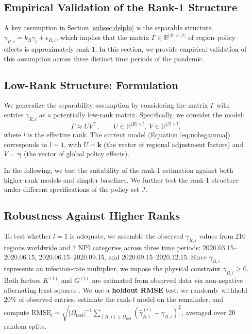 \documentclass[msom,blindrev]{informs3} %
\newcommand{\rev}[1]{{\color{blue}#1}}
\begin{document}
\begin{APPENDICES}
\section{\rev{Empirical Validation of the Rank-1 Structure}}
\label{app:separability}

{\color{blue}
A key assumption in Section \ref{subsec:delphi} is the separable structure $\gamma_{R,i} = k_R \gamma_i + \epsilon_{R,i}$, which implies that the matrix $\Gamma \in \mathbb{R}^{|\mathcal{R}| \times |\mathcal{I}|}$ of region--policy effects is approximately rank-1. In this section, we provide empirical validation of this assumption across three distinct time periods of the pandemic.

\subsection*{Low-Rank Structure: Formulation}
We generalize the separability assumption by considering the matrix $\Gamma$ with entries $\gamma_{R,i}$ as a potentially low-rank matrix. Specifically, we consider the model:
\begin{equation}
    \Gamma \approx U V^\top, \qquad U \in \mathbb{R}^{|R| \times l},\; V \in \mathbb{R}^{|\mathcal{I}| \times l},
\end{equation}
where $l$ is the effective rank. The current model (Equation \ref{eq:uobsgamma}) corresponds to $l = 1$, with $U = \bm{k}$ (the vector of regional adjustment factors) and $V = \bm{\gamma}$ (the vector of global policy effects). 

In the following, we test the suitability of the rank-1 estimation against both higher-rank models and simpler baselines. We further test the rank-1 structure under different specifications of the policy set $\mathcal{I}$.

\subsection{Robustness Against Higher Ranks}
\label{app:rank}
To test whether $l = 1$ is adequate, we assemble the observed $\gamma_{R,i}$ values from 210 regions worldwide and 7 NPI categories across three time periods: 2020.03.15--2020.06.15, 2020.06.15--2020.09.15, and 2020.09.15--2020.12.15. Since $\gamma_{R,i}$ represents an infection-rate multiplier, we impose the physical constraint $\gamma_{R,i} \geq 0$. Both factors $K^{(l)}$ and $G^{(l)}$ are estimated from observed data via non-negative alternating least squares . We use a \textbf{holdout RMSE} test: we randomly withhold 20\% of observed entries, estimate the rank-$l$ model on the remainder, and compute $\text{RMSE}_l = \sqrt{|\Omega_{\text{test}}|^{-1}\sum_{(R,i)\in\Omega_{\text{test}}} (\hat{\gamma}_{R,i}^{(l)} - \gamma_{R,i})^2}$, averaged over 20 random splits.

}
\end{APPENDICES}
\end{document}
